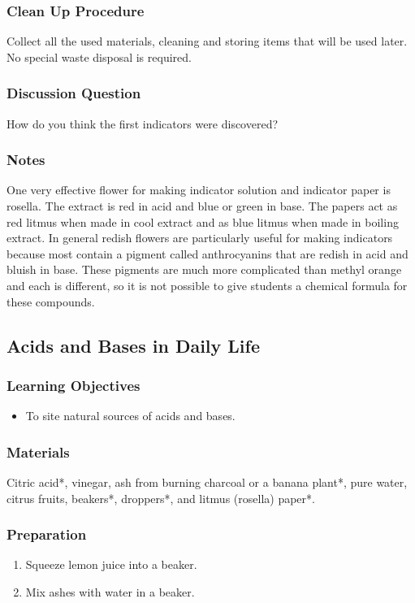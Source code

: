 \subsubsection*{Clean Up Procedure}
Collect all the used materials, cleaning and storing items that will be used later.  No special waste disposal is required.

\subsubsection*{Discussion Question}
How do you think the first indicators were discovered?

\subsubsection*{Notes}
One very effective flower for making indicator solution and indicator paper is rosella. The extract is red in acid and blue or green in base. The papers act as red litmus when made in cool extract and as blue litmus when made in boiling extract. In general redish flowers are particularly useful for making indicators because most contain a pigment called anthrocyanins that are redish in acid and bluish in base. These pigments are much more complicated than methyl orange and each is different, so it is not possible to give students a chemical formula for these compounds.

\subsection{Acids and Bases in Daily Life}

\subsubsection*{Learning Objectives}
\begin{itemize}
\item{To site natural sources of acids and bases.}
\end{itemize}

\subsubsection*{Materials}
Citric acid*, vinegar, ash from burning charcoal or a banana plant*, pure water, citrus fruits, beakers*, droppers*, and litmus (rosella) paper*.

\subsubsection*{Preparation}
\begin{enumerate}
\item{Squeeze lemon juice into a beaker.}
\item{Mix ashes with water in a beaker.}
\end{enumerate}

